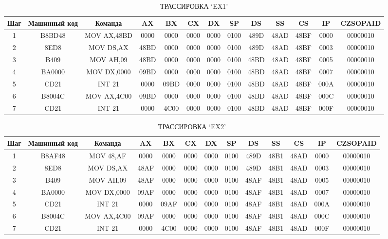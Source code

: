 \documentclass{report}
\begin{document}
 \begin{table}[h!]
	\begin{tabular}{|c|c|c|c|c|c|c|c|c|c|c|c|c|}
	\hline
	Шаг & Машинный код & Команда & AX & BX & CX & DX & SP & DS & SS & CS & IP & CZSOPAID \\
	\hline
1 & B8BD48 & MOV AX,48BD & 0000 & 0000 & 0000 & 0000 & 0100 & 489D & 48AD & 48BF & 0000 & 00000010 \\
  	\hline
2 & 8ED8 & MOV DS,AX & 48BD & 0000 & 0000 & 0000 & 0100 & 489D & 48AD & 48BF & 0003 & 00000010 \\
  	\hline
3 & B409 & MOV AH,09 & 48BD & 0000 & 0000 & 0000 & 0100 & 48BD & 48AD & 48BF & 0005 & 00000010 \\
  	\hline
4 & BA0000 & MOV DX,0000 & 09BD & 0000 & 0000 & 0000 & 0100 & 48BD & 48AD & 48BF & 0007 & 00000010 \\
  	\hline
5 & CD21 & INT 21 & 0000 & 09BD & 0000 & 0000 & 0100 & 48BD & 48AD & 48BF & 000A & 00000010 \\
  	\hline
 6 & B8004C & MOV AX,4C00 & 09BD & 0000 & 0000 & 0000 & 0100 & 48BD & 48AD & 48BF & 000C & 00000010 \\
  	\hline
7 & CD21 & INT 21 & 0000 & 4C00 & 0000 & 0000 & 0100 & 48BD & 48AD & 48BF & 000F & 00000010 \\
  	\hline
  	\end{tabular}
	\caption{ТРАССИРОВКА `EX1'}\label{tab1}
\end{table}

 \begin{table}[h!]
	\begin{tabular}{|c|c|c|c|c|c|c|c|c|c|c|c|c|}
	\hline
	Шаг & Машинный код & Команда & AX & BX & CX & DX & SP & DS & SS & CS & IP & CZSOPAID \\
	\hline
1 & B8AF48 & MOV 48,AF & 0000 & 0000 & 0000 & 0000 & 0100 & 489D & 48B1 & 48AD & 0000 & 00000010 \\
  	\hline
2 & 8ED8 & MOV DS,AX & 48AF & 0000 & 0000 & 0000 & 0100 & 489D & 48B1 & 48AD & 0003 & 00000010 \\
  	\hline
3 & B409 & MOV AH,09 & 48AF & 0000 & 0000 & 0000 & 0100 & 48AF & 48B1 & 48AD & 0005 & 00000010 \\
  	\hline
4 & BA0000 & MOV DX,0000 & 09AF & 0000 & 0000 & 0000 & 0100 & 48AF & 48B1 & 48AD & 0007 & 00000010 \\
  	\hline
5 & CD21 & INT 21 & 0000 & 09AF & 0000 & 0000 & 0100 & 48AF & 48B1 & 48AD & 000A & 00000010 \\
  	\hline
 6 & B8004C & MOV AX,4C00 & 09AF & 0000 & 0000 & 0000 & 0100 & 48AF & 48B1 & 48AD & 000C & 00000010 \\
  	\hline
7 & CD21 & INT 21 & 0000 & 4C00 & 0000 & 0000 & 0100 & 48AF & 48B1 & 48AD & 000F & 00000010 \\
  	\hline
  	\end{tabular}
	\caption{ТРАССИРОВКА `EX2'}\label{tab2}
\end{table}
\end{document}
